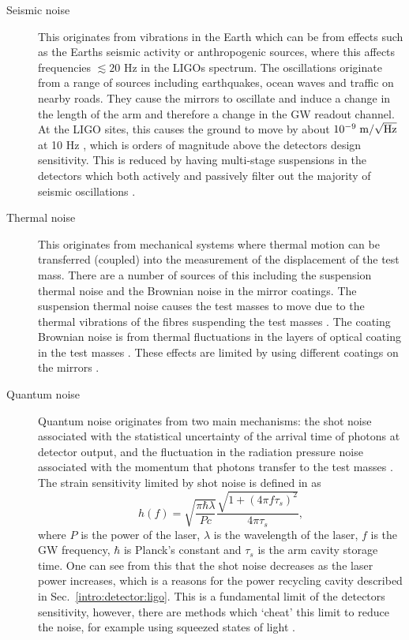 \begin{description}
\item[Seismic noise] This originates from vibrations in the Earth which can be from effects such as the Earths seismic
activity or anthropogenic sources, where this affects frequencies $\lesssim 20$ Hz in the \glspl{LIGO} spectrum. The oscillations originate
from a range of sources including earthquakes, ocean waves and traffic on nearby roads. They cause the mirrors to
oscillate and induce a change
in the length of the arm and therefore a change in the \gls{GW} readout channel. 
At the \gls{LIGO} sites, this causes the ground to move by about $10^{-9}\; \rm{m}/\sqrt{\rm{Hz}}$ at 10 Hz \citep{martynov2016SensitivityAdvanced}, which is orders of magnitude above the detectors design sensitivity. 
This is reduced by having multi-stage suspensions in the detectors which both actively and passively filter out the majority of seismic oscillations
\citep{matichard2015SeismicIsolation}.


\item[Thermal noise] This originates from mechanical systems where thermal motion can be transferred (coupled) into the measurement of the displacement of the test mass. There are a number of sources of this including the suspension thermal noise and the Brownian noise in the mirror coatings. 
The suspension thermal noise causes the test masses to move due to the thermal vibrations of the fibres suspending the test masses \citep{gonzalez2007HandbookApproximation}.
The coating Brownian noise is from thermal fluctuations in the layers of optical coating in the test masses \citep{martynov2016SensitivityAdvanced}. These effects are limited by using different coatings on the mirrors \citep{abernathy0OverviewResearch}.

\item[Quantum noise] Quantum noise originates from two main mechanisms: the shot noise associated with the
statistical uncertainty of the arrival time of photons at detector output, and the fluctuation in the radiation pressure noise associated with the momentum that photons transfer to the test masses \citep{aasi2013EnhancedSensitivity}.
The strain sensitivity limited by shot noise is defined in \citep{abbott2009LIGOLaser} as
\begin{equation}
	h(f) = \sqrt{\frac{\pi \hbar \lambda}{P c}} \frac{\sqrt{1 + (4 \pi f \tau_s)^2}}{4 \pi \tau_s},
\end{equation}
where $P$ is the power of the laser, $\lambda$ is the wavelength of the laser, $f$ is the \gls{GW} frequency, $\hbar$ is Planck's constant and $\tau_s$ is the arm cavity storage time. 
One can see from this that the shot noise decreases as the laser power increases, which is a reasons for the power recycling cavity described in Sec.~\ref{intro:detector:ligo}. 
This is a fundamental limit of the detectors sensitivity, however, there are methods which `cheat' this limit to reduce
the noise, for example using squeezed states of light \citep{aasi2013EnhancedSensitivity}. 


\end{description}
